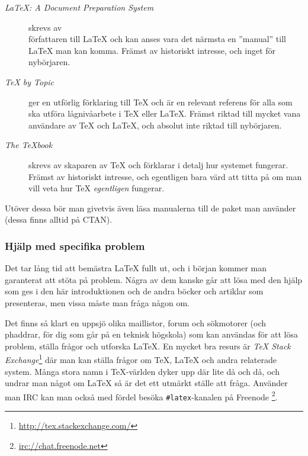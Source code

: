 \documentclass[lang=sv,ptsize=10pt,font=none,nomath,titles=bf,../../a4.tex]{subfiles}
\begin{document}
\begin{description}
	\item[\emph{\LaTeX: A Document Preparation System} \parencite{Lamport94}]
	skrevs av\\ författaren till \LaTeX{} och kan anses vara det närmsta en
	”manual” till \LaTeX{} man kan komma. Främst av historiskt intresse,
	och inget för nybörjaren.
	
	\item[\emph{\TeX{} by Topic} \parencite{Eijkhout92}]
	ger en utförlig förklaring till \TeX{} och är en relevant referens för
	alla som ska utföra lågnivåarbete i \TeX{} eller \LaTeX{}. Främst
	riktad till mycket vana användare av \TeX{} och \LaTeX{}, och absolut
	inte riktad till nybörjaren.
	
	\item[\emph{The \TeX{}book} \parencite{Knuth86}]
	skrevs av skaparen av \TeX{} och förklarar i detalj hur systemet
	fungerar. Främst av historiskt intresse, och egentligen bara värd att
	titta på om man vill veta hur \TeX{} \emph{egentligen} fungerar.
\end{description}

Utöver dessa bör man givetvis även läsa manualerna till de paket man
använder (dessa finns alltid på CTAN).

\subsubsection{Hjälp med specifika problem}
Det tar lång tid att bemästra \LaTeX{} fullt ut, och i början kommer man
garanterat att stöta på problem. Några av dem kanske går att lösa med den
hjälp som ges i den här introduktionen och de andra böcker och artiklar
som presenteras, men vissa måste man fråga någon om.

Det finns så klart en uppsjö olika maillistor, forum och sökmotorer (och
phaddrar, för dig som går på en teknisk högskola) som kan användas för att
lösa problem, ställa frågor och utforska \LaTeX. En mycket bra resurs är
\emph{\TeX{} Stack Exchange}\footnote{\url{http://tex.stackexchange.com/}}
där man kan ställa frågor om \TeX, \LaTeX{} och andra relaterade system.
Många stora namn i \TeX-världen dyker upp där lite då och då, och undrar
man något om \LaTeX{} så är det ett utmärkt ställe att fråga. Använder man
IRC kan man också med fördel besöka \verb|#latex|-kanalen på Freenode%
\footnote{\url{irc://chat.freenode.net}}.

\end{document}
